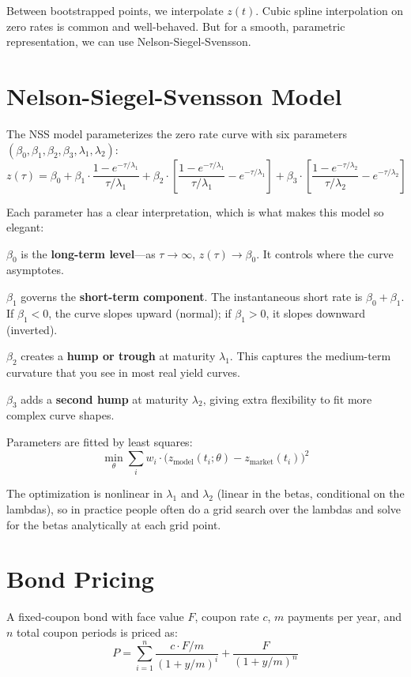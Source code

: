 \documentclass[11pt]{article}
\begin{document}
Between bootstrapped points, we interpolate $z(t)$. Cubic spline interpolation on zero rates is common and well-behaved. But for a smooth, parametric representation, we can use Nelson-Siegel-Svensson.

\section{Nelson-Siegel-Svensson Model}

The NSS model parameterizes the zero rate curve with six parameters $(\beta_0, \beta_1, \beta_2, \beta_3, \lambda_1, \lambda_2)$:
\[
z(\tau) = \beta_0 + \beta_1 \cdot \frac{1 - e^{-\tau/\lambda_1}}{\tau/\lambda_1} + \beta_2 \cdot \left[\frac{1 - e^{-\tau/\lambda_1}}{\tau/\lambda_1} - e^{-\tau/\lambda_1}\right] + \beta_3 \cdot \left[\frac{1 - e^{-\tau/\lambda_2}}{\tau/\lambda_2} - e^{-\tau/\lambda_2}\right]
\]

Each parameter has a clear interpretation, which is what makes this model so elegant:

$\beta_0$ is the \textbf{long-term level}---as $\tau \to \infty$, $z(\tau) \to \beta_0$. It controls where the curve asymptotes.

$\beta_1$ governs the \textbf{short-term component}. The instantaneous short rate is $\beta_0 + \beta_1$. If $\beta_1 < 0$, the curve slopes upward (normal); if $\beta_1 > 0$, it slopes downward (inverted).

$\beta_2$ creates a \textbf{hump or trough} at maturity $\lambda_1$. This captures the medium-term curvature that you see in most real yield curves.

$\beta_3$ adds a \textbf{second hump} at maturity $\lambda_2$, giving extra flexibility to fit more complex curve shapes.

Parameters are fitted by least squares:
\[
\min_{\theta} \sum_{i} w_i \cdot \big(z_{\text{model}}(t_i; \theta) - z_{\text{market}}(t_i)\big)^2
\]

The optimization is nonlinear in $\lambda_1$ and $\lambda_2$ (linear in the betas, conditional on the lambdas), so in practice people often do a grid search over the lambdas and solve for the betas analytically at each grid point.

\section{Bond Pricing}

A fixed-coupon bond with face value $F$, coupon rate $c$, $m$ payments per year, and $n$ total coupon periods is priced as:
\[
P = \sum_{i=1}^{n} \frac{c \cdot F / m}{(1 + y/m)^{i}} + \frac{F}{(1 + y/m)^{n}}
\]
\end{document}
